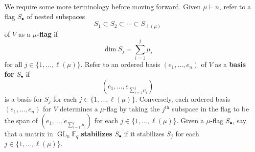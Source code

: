 \documentclass[10pt]{article}
\theoremstyle{definition}
\DeclareMathOperator{\GL}{GL}
\newcommand{\F}{\mathbb{F}}
\newcommand{\myemph}{\textbf}
\begin{document}
We require some more terminology before moving forward.
Given \(\mu \vdash n\), refer to a flag $S_\bullet$ of nested subspaces
$$ S_1 \subset S_2 \subset \cdots \subset S_{\ell(\mu)}$$
of $V$
as a \myemph{$\mu$-flag} if
$$\dim S_j = \sum_{i=1}^j \mu_i$$ for all $j \in \{1,\ldots,\ell(\mu)\}$.
Refer to an ordered basis $(e_1,\ldots,e_{n})$ of $V$ as a \myemph{basis for $S_\bullet$} if
$$ \left (e_1,\ldots,e_{\sum_{i=1}^j \mu_i} \right ) $$
is a basis for $S_j$ for each $j \in \{1,\ldots,\ell(\mu)\}$.
Conversely, each ordered basis \((e_1,\ldots,e_n)\) for \(V\) determines a \(\mu\)-flag by taking the \(j^\text{th}\) subspace in the flag to be the span of \(\left ( e_1,\ldots,e_{\sum_{i=1}^j \mu_i} \right )\) for each \(j \in \{1,\ldots,\ell(\mu)\}\).
Given a $\mu$-flag $S_\bullet$, say that a matrix in $\GL_{n} \F_q$ \myemph{stabilizes $S_\bullet$} if it stabilizes $S_j$ for each $j \in \{1,\ldots,\ell(\mu)\}$.
\end{document}
